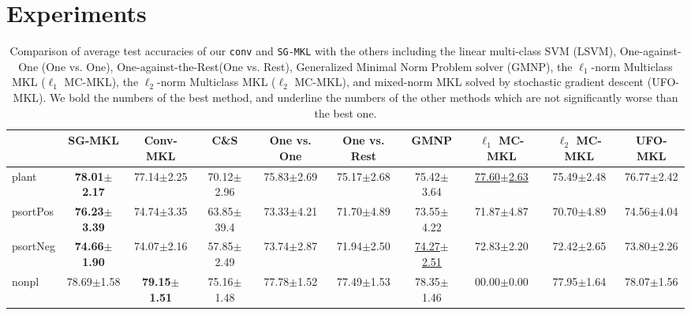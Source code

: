 \documentclass{article}
\begin{document}
\section{Experiments}

\begin{table*}[t]
\small
\footnotesize
   \caption{
    \small Comparison of average test accuracies of our \texttt{conv} and \texttt{SG-MKL} with the others including
    the linear multi-class SVM (LSVM),
    One-against-One (One vs. One),
    One-against-the-Rest(One vs. Rest),
    Generalized Minimal Norm Problem solver (GMNP),
    the $\ell_1$-norm Multiclass MKL ($\ell_1$ MC-MKL),
    the $\ell_2$-norm Multiclass MKL ($\ell_2$ MC-MKL),
    and mixed-norm MKL solved by stochastic gradient descent (UFO-MKL).
    We bold the numbers of the best method, and underline the numbers of the other methods
    which are not significantly worse than the best one.
   }
   \label{tabel:accuracy}
    \begin{tabular*}{\linewidth}{@{\extracolsep{-0.23cm}}lccccccccc}
    \toprule
                   & SG-MKL              & Conv-MKL               & C\&S               & One vs. One              & One vs. Rest                                              & GMNP                      & $\ell_1$ MC-MKL          & $\ell_2$ MC-MKL    & UFO-MKL                  \\ \hline
plant              & \textbf{78.01$\pm$2.17}   &77.14$\pm$2.25            & 70.12$\pm$2.96     & 75.83$\pm$2.69           &75.17$\pm$2.68       &75.42$\pm$3.64    & \underline{77.60$\pm$2.63}&75.49$\pm$2.48            &76.77$\pm$2.42\\
psortPos           & \textbf{76.23$\pm$3.39}   &74.74$\pm$3.35            &63.85$\pm$39.4      &73.33$\pm$4.21            &71.70$\pm$4.89       & 73.55$\pm$4.22   &71.87$\pm$4.87             &70.70$\pm$4.89            &74.56$\pm$4.04\\
psortNeg           & \textbf{74.66$\pm$1.90}   &74.07$\pm$2.16            &57.85$\pm$2.49      &73.74$\pm$2.87            &71.94$\pm$2.50   &\underline{74.27$\pm$2.51}   &72.83$\pm$2.20                             &72.42$\pm$2.65      &73.80$\pm$2.26 \\
nonpl              &78.69$\pm$1.58             & \textbf{79.15$\pm$1.51}  &75.16$\pm$1.48      &77.78$\pm$1.52            &77.49$\pm$1.53 &78.35$\pm$1.46    &00.00$\pm$0.00             &77.95$\pm$1.64            &78.07$\pm$1.56\\

\end{tabular*}
\end{table*}
\end{document}
